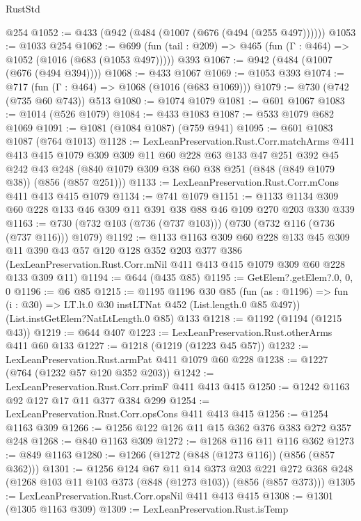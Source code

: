 \begin{lexlean}{RustStd}
\begin{coremodule}
    @254
@1052 := @433 (@942 (@484 (@1007 (@676 (@494 (@255 @497))))))
@1053 := @1033 @254
@1062 := @699 (fun (tail : @209) => @465 (fun (Γ : @464) => @1052 (@1016 (@683 (@1053 @497))))) @393
@1067 := @942 (@484 (@1007 (@676 (@494 @394))))
@1068 := @433 @1067
@1069 := @1053 @393
@1074 := @717 (fun (Γ : @464) => @1068 (@1016 (@683 @1069)))
@1079 := @730 (@742 (@735 @60 @743)) @513
@1080 := @1074 @1079
@1081 := @601 @1067
@1083 := @1014 (@526 @1079)
@1084 := @433 @1083
@1087 := @533 @1079 @682 @1069
@1091 := @1081 (@1084 @1087) (@759 @941)
@1095 := @601 @1083 @1087 (@764 @1013)
@1128 := LexLeanPreservation.Rust.Corr.matchArms
    @411
    @413
    @415
    @1079
    @309
    @309
    @11
    @60
    @228
    @63
    @133
    @47
    @251
    @392
    @45
    @242
    @43
    @248
    (@840 @1079 @309 @38 @60 @38 @251 (@848 (@849 @1079 @38)) (@856 (@857 @251)))
@1133 := LexLeanPreservation.Rust.Corr.mCons @411 @413 @415 @1079
@1134 := @741 @1079
@1151 := @1133 @1134 @309 @60 @228 @133 @46 @309 @11 @391 @38 @88 @46 @109 @270 @203 @330 @339
@1163 := @730 (@732 @103 (@736 (@737 @103))) (@730 (@732 @116 (@736 (@737 @116))) @1079)
@1192 := @1133
    @1163
    @309
    @60
    @228
    @133
    @45
    @309
    @11
    @390
    @43
    @57
    @120
    @128
    @352
    @203
    @377
    @386
    (LexLeanPreservation.Rust.Corr.mNil @411 @413 @415 @1079 @309 @60 @228 @133 @309 @11)
@1194 := @644 (@435 @85)
@1195 := GetElem?.getElem?.{0, 0, 0}
@1196 := @6 @85
@1215 := @1195
    @1196
    @30
    @85
    (fun (as : @1196) => fun (i : @30) => LT.lt.{0} @30 instLTNat @452 (List.length.{0} @85 @497))
    (List.instGetElem?NatLtLength.{0} @85)
    @133
@1218 := @1192 (@1194 (@1215 @43))
@1219 := @644 @407
@1223 := LexLeanPreservation.Rust.otherArms @411 @60 @133
@1227 := @1218 (@1219 (@1223 @45 @57))
@1232 := LexLeanPreservation.Rust.armPat @411 @1079 @60 @228
@1238 := @1227 (@764 (@1232 @57 @120 @352 @203))
@1242 := LexLeanPreservation.Rust.Corr.primF @411 @413 @415
@1250 := @1242 @1163 @92 @127 @17 @11 @377 @384 @299
@1254 := LexLeanPreservation.Rust.Corr.opsCons @411 @413 @415
@1256 := @1254 @1163 @309
@1266 := @1256 @122 @126 @11 @15 @362 @376 @383 @272 @357 @248
@1268 := @840 @1163 @309
@1272 := @1268 @116 @11 @116 @362
@1273 := @849 @1163
@1280 := @1266 (@1272 (@848 (@1273 @116)) (@856 (@857 @362)))
@1301 := @1256
    @124
    @67
    @11
    @14
    @373
    @203
    @221
    @272
    @368
    @248
    (@1268 @103 @11 @103 @373 (@848 (@1273 @103)) (@856 (@857 @373)))
@1305 := LexLeanPreservation.Rust.Corr.opsNil @411 @413 @415
@1308 := @1301 (@1305 @1163 @309)
@1309 := LexLeanPreservation.Rust.isTemp

\end{coremodule}
\end{lexlean}
